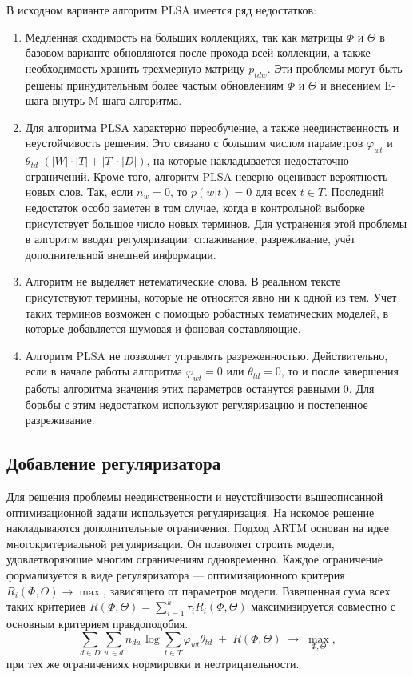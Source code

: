 \documentclass[12pt]{article}
\renewcommand{\phi}{\varphi}
\begin{document}
В исходном варианте алгоритм PLSA имеется ряд недостатков:
\begin{enumerate}
\item Медленная сходимость на больших коллекциях, так как матрицы $\Phi$ и $\Theta$ в базовом варианте обновляются после прохода всей коллекции, а также необходимость хранить трехмерную матрицу $p_{tdw}$. Эти проблемы могут быть решены принудительным более частым обновлениям $\Phi$ и $\Theta$ и внесением E-шага внутрь M-шага алгоритма.
\item Для алгоритма PLSA характерно переобучение, а также неединственность и неустойчивость решения. Это связано с большим числом параметров $\phi_{wt}$ и $\theta_{td}$ $(|W|\cdot|T|+|T|\cdot|D|)$, на которые накладывается недостаточно ограничений. Кроме того, алгоритм PLSA неверно оценивает вероятность новых слов. Так, если $n_w=0$, то $p(w|t)=0$ для всех  $t \in T$. Последний недостаток особо заметен в том случае, когда в контрольной выборке присутствует большое число новых терминов. Для устранения этой проблемы в алгоритм вводят регуляризации: сглаживание, разреживание, учёт дополнительной внешней информации.
\item Алгоритм не выделяет нетематические слова. В реальном тексте присутствуют термины, которые не относятся явно ни к одной из тем. Учет таких терминов возможен с помощью робастных тематических моделей, в которые добавляется шумовая и фоновая составляющие.
\item Алгоритм PLSA не позволяет управлять разреженностью. Действительно, если в начале работы алгоритма $\phi_{wt} = 0$ или $\theta_{td} = 0$, то и после завершения работы алгоритма значения этих параметров останутся равными 0. Для борьбы с этим недостатком используют регуляризацию и постепенное разреживание.
\end{enumerate}
	\subsection{Добавление регуляризатора}
Для решения проблемы неединственности и неустойчивости вышеописанной оптимизационной задачи используется регуляризация. На искомое решение накладываются дополнительные ограничения. Подход ARTM \cite{vorontsov2014additive, vorontsov2014tutorial, vorontsov2015additive} основан на идее многокритериальной регуляризации. Он позволяет строить модели, удовлетворяющие многим ограничениям одновременно. Каждое ограничение формализуется в виде регуляризатора --- оптимизационного критерия $R_i(\Phi,\Theta)\to\max$, зависящего от параметров модели. Взвешенная сума всех таких критериев $R(\Phi,\Theta) = \sum_{i=1}^k \tau_i R_i(\Phi,\Theta)$ максимизируется совместно с основным критерием правдоподобия.
\[
\sum_{d\in D} \sum_{w\in d} n_{dw}\log \sum_{t\in T} \phi_{wt}\theta_{td} \;+\; R(\Phi,\Theta)\;\to\; \max_{\Phi,\Theta},
\]
при тех же ограничениях нормировки и неотрицательности.
\end{document}
